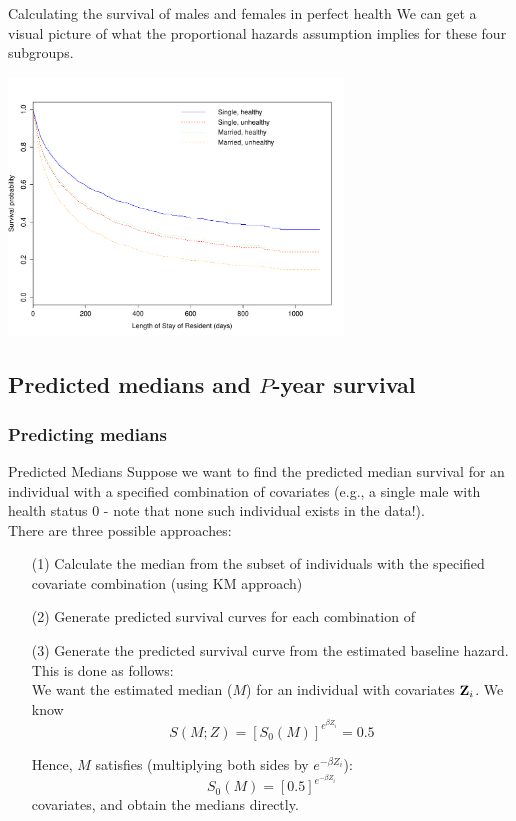 \documentclass[envcountsect, 10pt, portrait, palatino]{beamer}
\newcommand{\bfZ}{{\mbox{{\bf Z}}}}
\begin{document}
\begin{frame}{Calculating the survival of males and females in perfect health}
We can get a visual picture of what the proportional
hazards assumption implies for these four subgroups.
\vspace*{-1in}
\centerline{\includegraphics[width=3.5in]{nhpredsurv2.pdf}}
\vspace*{1in}
\end{frame}

\subsection{Predicted medians and $P$-year survival}
\subsubsection{Predicting medians}
\begin{frame}{Predicted Medians}
Suppose we want to find the predicted median survival for an
individual with a specified combination of covariates
(e.g., a single male with health status 0 - note that none such individual exists in the data!).\\[2ex]
There are three possible approaches:
\begin{itemize}
\item[(1)] Calculate the median from the subset of individuals with the
specified covariate combination (using KM approach)
\item[(2)] Generate predicted survival curves for each combination of
\item[(3)] Generate the predicted survival curve from the estimated
baseline hazard.  This is done as follows:\\
We want the estimated median ($M$) for an individual with
covariates ${\bfZ_i}$.  We know
\[ S(M;Z) =  [S_0(M)]^{e^{\beta Z_i}}  = 0.5   \]

Hence, $M$ satisfies (multiplying both sides by $e^{-\beta Z_i}$):
\[  S_0(M)  = [0.5]^{e^{-\beta Z_i}}  \]
covariates, and obtain the medians directly.
\end{itemize}
\end{frame}
\end{document}
